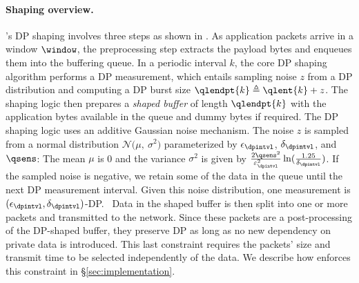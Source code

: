 \paragraph{Shaping overview.}
\sys's DP shaping involves three steps as shown in .
 As application packets arrive in a window $\window$, the
preprocessing
step extracts the payload bytes and enqueues them into the buffering queue.
 In a periodic interval $k$, the core DP shaping algorithm
{performs a DP measurement, which entails} sampling noise $z$ from a DP
distribution and computing a DP burst size
$\qlendpt{k} \triangleq \qlent{k} + z$.
The shaping logic then
prepares a {\em shaped buffer} of length $\qlendpt{k}$ with
the application bytes available in the queue and dummy bytes if required.
The DP shaping logic uses an additive Gaussian noise mechanism.
The noise $z$ is sampled from a normal distribution
$\mathcal{N}\big(\mu,~\sigma^2\big)$ parameterized by $\epsilon_\dpintvl$,
$\delta_\dpintvl$, and~$\qsens$:
The mean $\mu$ is 0 and the variance $\sigma^2$ is given by
$\frac{2\qsens^2}{\varepsilon_\dpintvl^2}\ln(\frac{1.25}{\delta_\dpintvl})$.
{If the sampled noise is negative, we retain some of the data in the
queue until the next DP measurement interval.}
Given this noise distribution, one measurement is \mbox{$(\epsilon_\dpintvl,
\delta_\dpintvl)$-DP}.
%
~Data in the shaped buffer is then split into one or more packets
and transmitted to the network. Since these packets are a post-processing of the
DP-shaped buffer, they preserve DP as long as no new dependency on private data
is introduced. This last constraint requires the packets' size and transmit time
to be selected independently of the data.
We describe how {\sys} enforces this constraint in \S\ref{sec:implementation}.

